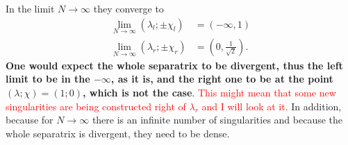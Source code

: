 In the limit $N\rightarrow\infty$ they converge to
\begin{align*}
    \lim_{N\rightarrow \infty}(\lambda_l ;\pm\chi_l)&= \left(-\infty,1\right)\\
    \lim_{N\rightarrow \infty}(\lambda_r ;\pm\chi_r)&= \left(0,\frac{1}{\sqrt{2}}\right).
\end{align*}
\textbf{One would expect the whole separatrix to be divergent, thus the left limit to be in the $-\infty$, as it is, and the right one to be at the point $(\lambda;\chi)=(1;0)$, which is not the case}. \textcolor{red}{This might mean that some new singularities are being constructed right of $\lambda_r$ and I will look at it.} In addition, because for $N\rightarrow\infty$ there is an infinite number of singularities and because the whole separatrix is divergent, they need to be dense.



